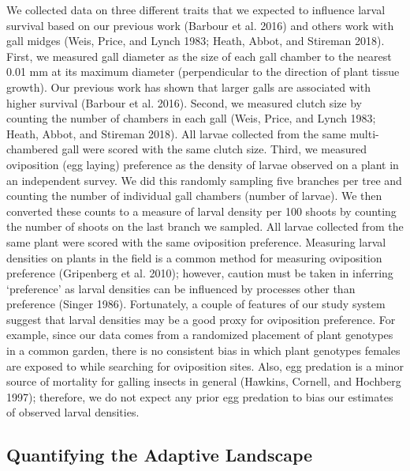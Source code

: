 \documentclass[11pt,]{article}
\begin{document}
We collected data on three different traits that we expected to
influence larval survival based on our previous work (Barbour et al.
2016) and others work with gall midges (Weis, Price, and Lynch 1983;
Heath, Abbot, and Stireman 2018). First, we measured gall diameter as
the size of each gall chamber to the nearest 0.01 mm at its maximum
diameter (perpendicular to the direction of plant tissue growth). Our
previous work has shown that larger galls are associated with higher
survival (Barbour et al. 2016). Second, we measured clutch size by
counting the number of chambers in each gall (Weis, Price, and Lynch
1983; Heath, Abbot, and Stireman 2018). All larvae collected from the
same multi-chambered gall were scored with the same clutch size. Third,
we measured oviposition (egg laying) preference as the density of larvae
observed on a plant in an independent survey. We did this randomly
sampling five branches per tree and counting the number of individual
gall chambers (number of larvae). We then converted these counts to a
measure of larval density per 100 shoots by counting the number of
shoots on the last branch we sampled. All larvae collected from the same
plant were scored with the same oviposition preference. Measuring larval
densities on plants in the field is a common method for measuring
oviposition preference (Gripenberg et al. 2010); however, caution must
be taken in inferring `preference' as larval densities can be influenced
by processes other than preference (Singer 1986). Fortunately, a couple
of features of our study system suggest that larval densities may be a
good proxy for oviposition preference. For example, since our data comes
from a randomized placement of plant genotypes in a common garden, there
is no consistent bias in which plant genotypes females are exposed to
while searching for oviposition sites. Also, egg predation is a minor
source of mortality for galling insects in general (Hawkins, Cornell,
and Hochberg 1997); therefore, we do not expect any prior egg predation
to bias our estimates of observed larval densities.

\subsection{Quantifying the Adaptive
Landscape}\label{quantifying-the-adaptive-landscape}
\end{document}
